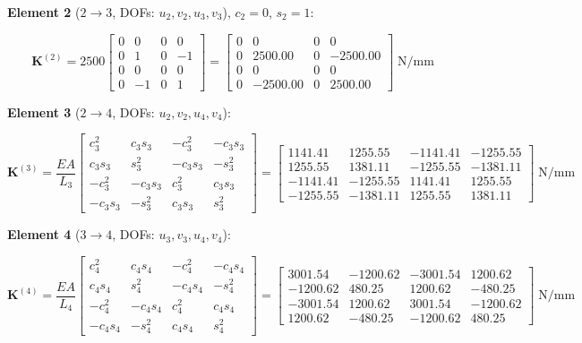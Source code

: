 \documentclass[11pt, a4paper]{article}
\begin{document}
\noindent\textbf{Element 2} ($2\!\to\!3$, DOFs: $u_2,v_2,u_3,v_3$),\; $c_2=0$, $s_2=1$:

\[
\mathbf{K}^{(2)} = 2500
\begin{bmatrix}
0 & 0 & 0 & 0 \\
0 & 1 & 0 & -1 \\
0 & 0 & 0 & 0 \\
0 & -1& 0 & 1
\end{bmatrix}
=
\begin{bmatrix}
0 & 0 & 0 & 0 \\
0 & 2500.00 & 0 & -2500.00 \\
0 & 0 & 0 & 0 \\
0 & -2500.00 & 0 & 2500.00
\end{bmatrix}\;\text{N/mm}
\]

\noindent\textbf{Element 3} ($2\!\to\!4$, DOFs: $u_2,v_2,u_4,v_4$):

\begingroup\small
\setlength{\arraycolsep}{3pt}
\[
\mathbf{K}^{(3)} = \frac{EA}{L_3}
\begin{bmatrix}
c_3^2 & c_3 s_3 & -c_3^2 & -c_3 s_3 \\
c_3 s_3 & s_3^2 & -c_3 s_3 & -s_3^2 \\
-c_3^2 & -c_3 s_3 & c_3^2 & c_3 s_3 \\
-c_3 s_3 & -s_3^2 & c_3 s_3 & s_3^2
\end{bmatrix}
=
\begin{bmatrix}
 1141.41 &  1255.55 & -1141.41 & -1255.55 \\
 1255.55 &  1381.11 & -1255.55 & -1381.11 \\
-1141.41 & -1255.55 &  1141.41 &  1255.55 \\
-1255.55 & -1381.11 &  1255.55 &  1381.11
\end{bmatrix}\;\text{N/mm}
\]
\endgroup

\noindent\textbf{Element 4} ($3\!\to\!4$, DOFs: $u_3,v_3,u_4,v_4$):

\begingroup\small
\setlength{\arraycolsep}{3pt}
\[
\mathbf{K}^{(4)} = \frac{EA}{L_4}
\begin{bmatrix}
c_4^2 & c_4 s_4 & -c_4^2 & -c_4 s_4 \\
c_4 s_4 & s_4^2 & -c_4 s_4 & -s_4^2 \\
-c_4^2 & -c_4 s_4 & c_4^2 & c_4 s_4 \\
-c_4 s_4 & -s_4^2 & c_4 s_4 & s_4^2
\end{bmatrix}
=
\begin{bmatrix}
 3001.54 & -1200.62 & -3001.54 &  1200.62 \\
-1200.62 &   480.25 &  1200.62 &  -480.25 \\
-3001.54 &  1200.62 &  3001.54 & -1200.62 \\
 1200.62 &  -480.25 & -1200.62 &   480.25
\end{bmatrix}\;\text{N/mm}
\]
\endgroup
\end{document}
